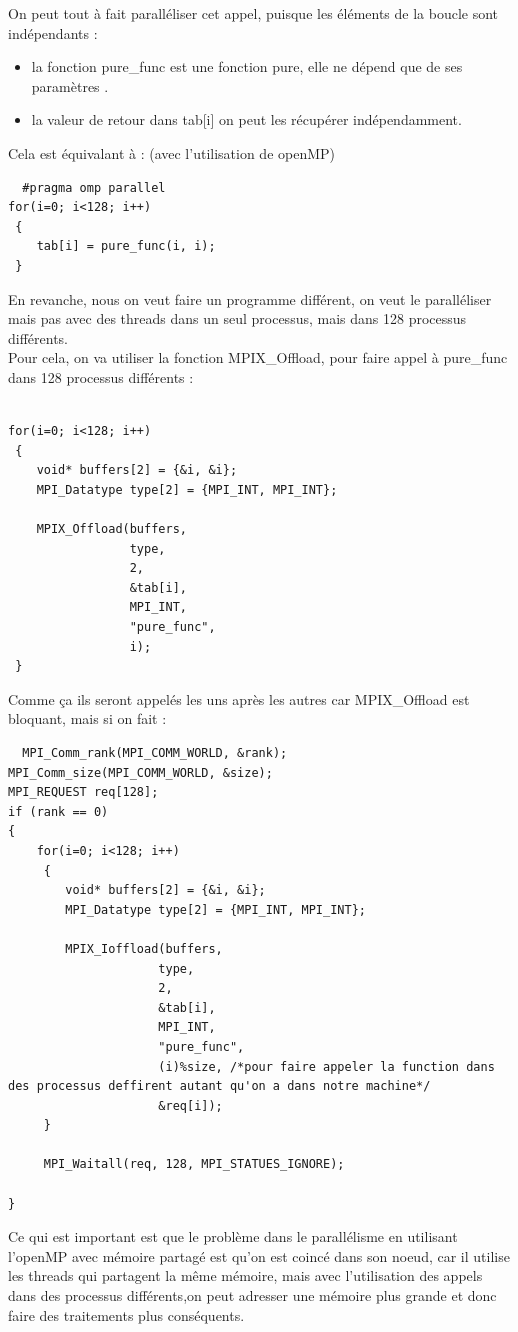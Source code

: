 \documentclass[12pt,a4paper]{article}
\begin{document}
On peut tout à fait paralléliser cet appel, puisque les éléments de la boucle sont indépendants :
\begin{itemize}
    \item la fonction pure\_func est une fonction pure, elle ne dépend que de ses paramètres .
 \item la valeur de retour dans tab[i] on peut les récupérer indépendamment.
\end{itemize}
Cela est équivalant à : (avec l'utilisation de openMP) 

\begin{lstlisting}
  #pragma omp parallel  
for(i=0; i<128; i++) 
 { 
 	tab[i] = pure_func(i, i); 
 }
\end{lstlisting}

En revanche, nous on veut faire un programme différent, on veut le paralléliser mais pas avec des  threads dans un seul processus, mais dans 128 processus différents. \\
Pour cela, on va utiliser la fonction MPIX\_Offload, pour faire appel à pure\_func dans 128 processus différents :

\begin{lstlisting}
  
for(i=0; i<128; i++)
 {
 	void* buffers[2] = {&i, &i};
 	MPI_Datatype type[2] = {MPI_INT, MPI_INT};

 	MPIX_Offload(buffers,
 				 type,
 				 2,
 				 &tab[i],
 				 MPI_INT,
 				 "pure_func",
 				 i);
 }
 \end{lstlisting}
Comme ça ils seront appelés les uns après les autres car MPIX\_Offload est bloquant, mais si on fait :
\begin{lstlisting}
  MPI_Comm_rank(MPI_COMM_WORLD, &rank);
MPI_Comm_size(MPI_COMM_WORLD, &size);
MPI_REQUEST req[128];
if (rank == 0)
{
	for(i=0; i<128; i++)
	 {
	 	void* buffers[2] = {&i, &i};
	 	MPI_Datatype type[2] = {MPI_INT, MPI_INT};

	 	MPIX_Ioffload(buffers,
	 				 type,
	 				 2,
	 				 &tab[i],
	 				 MPI_INT,
	 				 "pure_func",
	 				 (i)%size, /*pour faire appeler la function dans des processus deffirent autant qu'on a dans notre machine*/
	 				 &req[i]);
	 }

	 MPI_Waitall(req, 128, MPI_STATUES_IGNORE);

}
\end{lstlisting}

Ce qui est important est que le problème dans le parallélisme en utilisant l'openMP avec mémoire partagé est qu'on est coincé dans son noeud, car il utilise les threads qui partagent la même mémoire, mais avec l'utilisation des appels dans des processus différents,on peut adresser une mémoire plus grande et donc faire des traitements plus conséquents.
\end{document}
